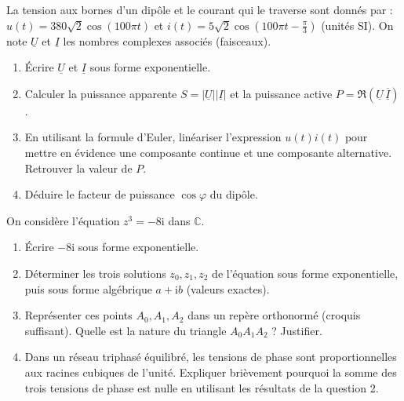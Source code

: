 \documentclass[11pt]{article}
\begin{document}
\begin{exercice}
La tension aux bornes d'un dipôle et le courant qui le traverse sont donnés par :
$u(t) = 380\sqrt{2}\cos(100\pi t)$ et $i(t) = 5\sqrt{2}\cos\left(100\pi t - \frac{\pi}{3}\right)$ (unités SI).
On note $\underline{U}$ et $\underline{I}$ les nombres complexes associés (faisceaux).
\begin{enumerate}
    \item Écrire $\underline{U}$ et $\underline{I}$ sous forme exponentielle.
    \item Calculer la puissance apparente $S = |\underline{U}||\underline{I}|$ et la puissance active $P = \Re(\underline{U}\,\overline{\underline{I}})$.
    \item En utilisant la formule d'Euler, linéariser l'expression $u(t)i(t)$ pour mettre en évidence une composante continue et une composante alternative. Retrouver la valeur de $P$.
    \item Déduire le facteur de puissance $\cos\varphi$ du dipôle.
\end{enumerate}
\end{exercice}

\begin{exercice}
On considère l'équation $z^3 = -8\mathrm{i}$ dans $\mathbb{C}$.
\begin{enumerate}
    \item Écrire $-8\mathrm{i}$ sous forme exponentielle.
    \item Déterminer les trois solutions $z_0, z_1, z_2$ de l'équation sous forme exponentielle, puis sous forme algébrique $a + \mathrm{i}b$ (valeurs exactes).
    \item Représenter ces points $A_0, A_1, A_2$ dans un repère orthonormé (croquis suffisant). Quelle est la nature du triangle $A_0A_1A_2$ ? Justifier.
    \item Dans un réseau triphasé équilibré, les tensions de phase sont proportionnelles aux racines cubiques de l'unité. Expliquer brièvement pourquoi la somme des trois tensions de phase est nulle en utilisant les résultats de la question 2.
\end{enumerate}
\end{exercice}
\end{document}
